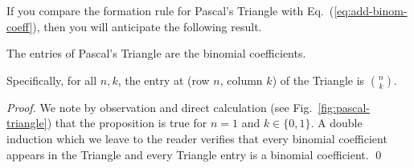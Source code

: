 
\medskip

If you compare the formation rule for Pascal's Triangle with Eq.~(\ref{eq:add-binom-coeff}), then you will anticipate the following result.

\begin{prop}
\label{thm:pascal-binom}
The entries of Pascal's Triangle are the binomial coefficients.

\smallskip

\noindent
Specifically, for all $n,k$, the entry at (row $n$, column $k$) of the Triangle is $\displaystyle {n \choose k}$.
\end{prop}

\begin{proof}
We note by observation and direct calculation (see Fig.~\ref{fig:pascal-triangle}) that the proposition is true for $n = 1$ and $k \in \{0, 1\}$.  A double induction which we leave to the reader verifies that every binomial coefficient appears in the Triangle and every Triangle entry is a binomial coefficient.  \qed
\end{proof}


\medskip

